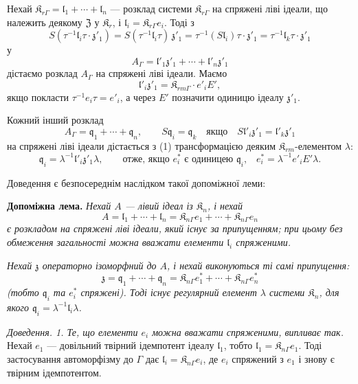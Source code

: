 \documentclass[11pt]{article}
\begin{document}
Нехай \(\mathfrak K_{r\Gamma}=\mathfrak l_1+\cdots+\mathfrak l_n\) --- розклад системи \(\mathfrak K_{r\Gamma}\) на спряжені ліві ідеали, що належить деякому \(\mathfrak Z\) у \(\mathfrak K_r\), і \(\mathfrak l_i=\mathfrak K_{r\Gamma}e_i\). Тоді з
\[
S(\tau^{-1}\mathfrak l_i\tau\cdot\mathfrak z'_1)
=S(\tau^{-1}\mathfrak l_i\tau)\,\mathfrak z'_1
=\tau^{-1}(S\mathfrak l_i)\tau\cdot\mathfrak z'_1
=\tau^{-1}\mathfrak l_k\tau\cdot\mathfrak z'_1
\]
у
\[
\tag{1}
A_\Gamma=\mathfrak l'_1\mathfrak z'_1+\cdots+\mathfrak l'_n\mathfrak z'_1
\]
дістаємо розклад \(A_\Gamma\) на спряжені ліві ідеали. Маємо
\[
\mathfrak l'_i\mathfrak z'_1=\mathfrak K_{rm\Gamma}\cdot e'_iE',
\]
якщо покласти \(\tau^{-1}e_i\tau=e'_i\), а через \(E'\) позначити одиницю ідеалу \(\mathfrak z'_1\).

Кожний інший розклад
\[
\tag{2}
A_\Gamma=\mathfrak q_1+\cdots+\mathfrak q_n,\qquad
S\mathfrak q_i=\mathfrak q_k\quad\text{якщо}\quad
S\mathfrak l'_i\mathfrak z'_1=\mathfrak l'_k\mathfrak z'_1
\]
на спряжені ліві ідеали дістається з (1) трансформацією деяким \(\mathfrak K_{rm}\)-елементом \(\lambda\):
\[
\mathfrak q_i=\lambda^{-1}\mathfrak l'_i\mathfrak z'_1\lambda,
\qquad
\text{отже, якщо \(e_i^*\) є одиницею \(\mathfrak q_i\),}\quad
e_i^*=\lambda^{-1}e'_iE'\lambda.
\]

Доведення є безпосереднім наслідком такої допоміжної леми:

\textbf{Допоміжна лема.} \emph{Нехай \(A\) --- лівий ідеал із \(\mathfrak K_n\), і нехай}
\[
A=\mathfrak l_1+\cdots+\mathfrak l_n
=\mathfrak K_{n\Gamma}e_1+\cdots+\mathfrak K_{n\Gamma}e_n
\]
\emph{є розкладом на спряжені ліві ідеали, який існує за припущенням; при цьому без обмеження загальності можна вважати елементи \(\mathfrak l_i\) спряженими.}

\emph{Нехай \(\mathfrak z\) операторно ізоморфний до \(A\), і нехай виконуються ті самі припущення:}
\[
\mathfrak z=\mathfrak q_1+\cdots+\mathfrak q_n
=\mathfrak K_{n\Gamma}e_1^*+\cdots+\mathfrak K_{n\Gamma}e_n^*
\]
\emph{(тобто \(\mathfrak q_i\) та \(e_i^*\) спряжені). Тоді існує регулярний елемент \(\lambda\) системи \(\mathfrak K_n\), для якого \(\mathfrak q_i=\lambda^{-1}\mathfrak l_i\lambda\).}

\emph{Доведення. 1. Те, що елементи \(e_i\) можна вважати спряженими, випливає так.} Нехай \(e_1\) --- довільний твірний ідемпотент ідеалу \(\mathfrak l_1\), тобто \(\mathfrak l_1=\mathfrak K_{n\Gamma}e_1\). Тоді застосування автоморфізму до \(\Gamma\) дає \(\mathfrak l_i=\mathfrak K_{n\Gamma}e_i\), де \(e_i\) спряжений з \(e_1\) і знову є твірним ідемпотентом.
\end{document}
